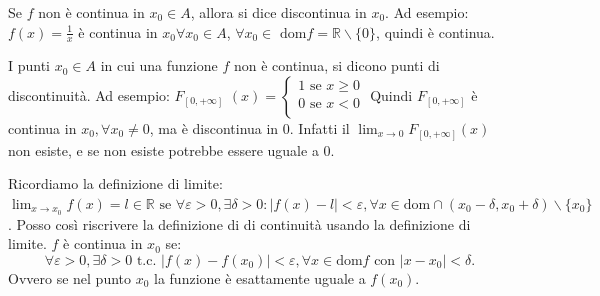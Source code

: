 Se $f$ non è continua in $x_0\in A$, allora si dice discontinua in $x_0$.
Ad esempio: $f(x)=\frac{1}{x}$ è continua in $x_0\forall x_0\in A$, $\forall x_0\in\text{ dom}f=\mathbb{R}\backslash\{0\}$, quindi è continua.

I punti $x_0\in A$ in cui una funzione $f$ non è continua, si dicono punti di discontinuità.
Ad esempio: $F_{[0,+\infty]}$ $(x)=\begin{cases}
    1\text{ se } x\geq 0\\
    0\text{ se } x<0\\
\end{cases}$
Quindi $F_{[0,+\infty]}$ è continua in $x_0,\forall x_0\neq 0$, ma è discontinua in 0.
Infatti il $\lim_{x\to 0}F_{[0,+\infty]}(x)$ non esiste, e se non esiste potrebbe essere uguale a 0.

Ricordiamo la definizione di limite: $\lim_{x\to x_0}f(x)=l\in\mathbb{R}\text{ se } \forall\varepsilon>0,\exists\delta>0:|f(x)-l|<\varepsilon,\forall x\in\text{dom}\cap (x_0-\delta, x_0+\delta)\backslash\{x_0\}$.
Posso così riscrivere la definizione di di continuità usando la definizione di limite. $f$ è continua in $x_0$ se: 
\begin{equation*}
    \forall\varepsilon>0,\exists\delta>0\text{ t.c. }|f(x)-f(x_0)|<\varepsilon,\forall x\in\text{dom}f\text{ con }|x-x_0|<\delta.    
\end{equation*}
Ovvero se nel punto $x_0$ la funzione è esattamente uguale a $f(x_0)$.

\begin{center}
\end{center}

